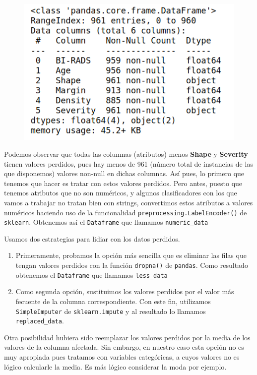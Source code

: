 \documentclass[a4paper,11pt]{article}
\begin{document}
\begin{figure}[H]
	\centering
	\includegraphics[width=0.7\linewidth]{img/image1}
	\caption{}
	\label{fig:image1}
\end{figure}

Podemos observar que todas las columnas (atributos) menos \textbf{Shape} y \textbf{Severity} tienen valores perdidos, pues hay menos de 961 (número total de instancias de las que disponemos) valores non-null en dichas columnas. Así pues, lo primero que tenemos que hacer es tratar con estos valores perdidos. Pero antes, puesto que tenemos atributos que no son numéricos, y algunos clasificadores con los que vamos a trabajar no tratan bien con strings, convertimos estos atributos a valores numéricos haciendo uso de la funcionalidad \texttt{preprocessing.LabelEncoder()} de \texttt{sklearn}. Obtenemos así el \texttt{Dataframe} que llamamos \texttt{numeric_data}

Usamos dos estrategias para lidiar con los datos perdidos.
\begin{enumerate}
	\item Primeramente, probamos la opción más sencilla que es eliminar las filas que tengan valores perdidos con la función \texttt{dropna()} de \texttt{pandas}. Como resultado obtenemos el \texttt{Dataframe} que llamamos \texttt{less_data}
	\item Como segunda opción, sustituimos los valores perdidos por el valor más fecuente de la columna correspondiente. Con este fin, utilizamos \texttt{SimpleImputer} de \texttt{sklearn.impute} y al resultado lo llamamos \texttt{replaced_data}.
\end{enumerate}

Otra posibilidad hubiera sido reemplazar los valores perdidos por la media de los valores de la columna afectada. Sin embargo, en nuestro caso esta opción no es muy apropiada pues tratamos con variables categóricas, a cuyos valores no es lógico calcularle la media. Es más lógico considerar la moda por ejemplo. 
\end{document}

